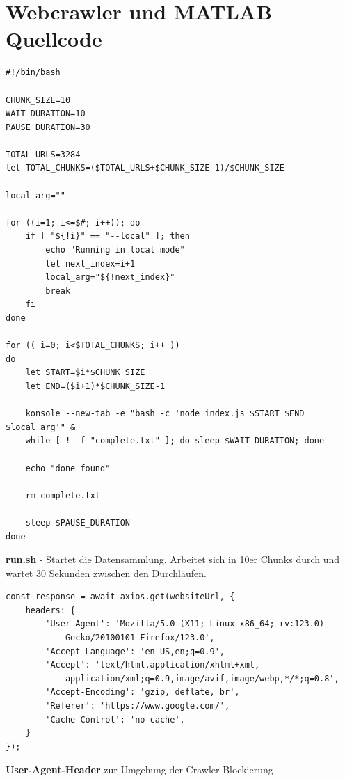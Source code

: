 \documentclass[Bachelor,BIF,german,IEEE]{BASE/twbook}
\begin{document}
\clearpage

\chapter{Webcrawler und MATLAB Quellcode}
\label{chap:appendix}

\begin{listing}[htbp]
\begin{verbatim}
#!/bin/bash

CHUNK_SIZE=10
WAIT_DURATION=10
PAUSE_DURATION=30

TOTAL_URLS=3284
let TOTAL_CHUNKS=($TOTAL_URLS+$CHUNK_SIZE-1)/$CHUNK_SIZE

local_arg=""

for ((i=1; i<=$#; i++)); do
    if [ "${!i}" == "--local" ]; then
        echo "Running in local mode"
        let next_index=i+1
        local_arg="${!next_index}"
        break
    fi
done

for (( i=0; i<$TOTAL_CHUNKS; i++ ))
do
    let START=$i*$CHUNK_SIZE
    let END=($i+1)*$CHUNK_SIZE-1

    konsole --new-tab -e "bash -c 'node index.js $START $END $local_arg'" &
    while [ ! -f "complete.txt" ]; do sleep $WAIT_DURATION; done

    echo "done found"
    
    rm complete.txt

    sleep $PAUSE_DURATION
done
\end{verbatim}
\caption{\textbf{run.sh} - Startet die Datensammlung. Arbeitet sich in 10er Chunks durch und wartet 30 Sekunden zwischen den Durchläufen.}
\label{code:run}
\end{listing}


\begin{listing}[htbp]
\begin{verbatim}
const response = await axios.get(websiteUrl, {
    headers: {
        'User-Agent': 'Mozilla/5.0 (X11; Linux x86_64; rv:123.0) 
            Gecko/20100101 Firefox/123.0',
        'Accept-Language': 'en-US,en;q=0.9',
        'Accept': 'text/html,application/xhtml+xml,
            application/xml;q=0.9,image/avif,image/webp,*/*;q=0.8',
        'Accept-Encoding': 'gzip, deflate, br',
        'Referer': 'https://www.google.com/',
        'Cache-Control': 'no-cache',
    }
});
\end{verbatim}
\caption{\textbf{User-Agent-Header} zur Umgehung der Crawler-Blockierung}
\label{code:useragent}
\end{listing}
\end{document}

